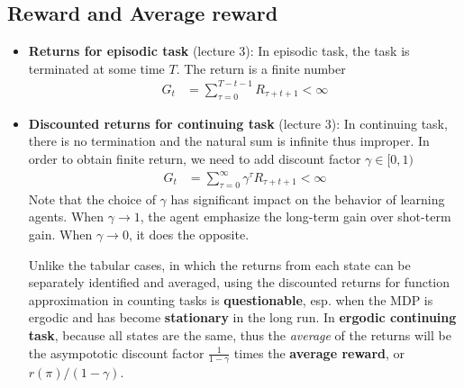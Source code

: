 \documentclass[11pt]{article}
\begin{document}
\subsection{Reward and Average reward}
\begin{itemize}
\item \textbf{Returns for episodic task} (lecture 3): In episodic task, the task is terminated at some time $T$. The return is a finite number
\begin{align}
G_{t} &= \sum_{\tau=0}^{T-t-1}R_{\tau+t+1} < \infty \label{eqn: returns_episodic}
\end{align}

\item \textbf{Discounted returns for continuing task} (lecture 3): In continuing task, there is no termination and the natural sum is infinite thus improper. In order to obtain finite return, we need to add discount factor $\gamma \in [0, 1)$
\begin{align}
G_{t} &= \sum_{\tau=0}^{\infty}\gamma^{\tau} R_{\tau+t+1} < \infty \label{eqn: returns_discount_continuing}
\end{align} Note that the choice of $\gamma$ has significant impact on the behavior of learning agents. When $\gamma \rightarrow 1$, the agent emphasize the long-term gain over shot-term gain. When $\gamma \rightarrow 0$, it does the opposite.  

Unlike the tabular cases, in which the returns from each state can be separately identified and averaged, using the discounted returns for function approximation in counting tasks is \textbf{questionable}, esp. when the MDP is ergodic and has become \textbf{stationary} in the long run.  In \textbf{ergodic continuing task}, because all states are the same, thus the \emph{average} of the returns will be the asympototic discount factor $\frac{1}{1-\gamma}$ times the \textbf{average reward}, or $r(\pi)/(1-\gamma)$.  



\end{itemize}
\end{document}
